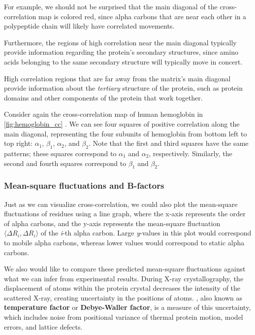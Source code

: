 For example, we should not be surprised that the main diagonal of the cross-correlation map is colored red, since alpha carbons that are near each other in a polypeptide chain will likely have correlated movements.

Furthermore, the regions of high correlation near the main diagonal typically provide information regarding the protein's secondary structures, since amino acids belonging to the same secondary structure will typically move in concert.

High correlation regions that are far away from the matrix's main diagonal provide information about the \textit{tertiary} structure of the protein, such as protein domains and other components of the protein that work together.

Consider again the cross-correlation map of human hemoglobin in \autoref{fig:hemoglobin_cc} . We can see four squares of positive correlation along the main diagonal, representing the four subunits of hemoglobin from bottom left to top right: $\alpha_1$, $\beta_1$, $\alpha_2$, and $\beta_2$. Note that the first and third squares have the same patterns; these squares correspond to $\alpha_1$ and $\alpha_2$, respectively. Similarly, the second and fourth squares correspond to $\beta_1$ and $\beta_2$.\\

\begin{qbox}\end{qbox}

\FloatBarrier
{}
\subsubsection{Mean-square fluctuations and B-factors}

Just as we can visualize cross-correlation, we could also plot the mean-square fluctuations of residues using a line graph, where the x-axis represents the order of alpha carbons, and the y-axis represents the mean-square fluctuation $ \langle \Delta R_i, \Delta R_i \rangle $ of the \textit{i}-th alpha carbon. Large \textit{y}-values in this plot would correspond to mobile alpha carbons, whereas lower values would correspond to static alpha carbons.

We also would like to compare these predicted mean-square fluctuations against what we can infer from experimental results. During X-ray crystallography, the displacement of atoms within the protein crystal decreases the intensity of the scattered X-ray, creating uncertainty in the positions of atoms. , also known as \textbf{temperature factor} or \textbf{Debye-Waller factor}, is a measure of this uncertainty, which includes noise from positional variance of thermal protein motion, model errors, and lattice defects.


